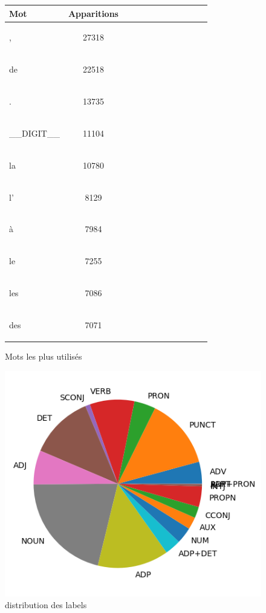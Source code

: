 \begin{figure}[H] \begin{minipage}{0.48\textwidth} \centering \begin{tabular}{|l || *{11 }{|c} |} \hline
Mot & Apparitions  \\ \hline
\begin{verb} , \end{verb} &27318\\ \hline
\begin{verb} de \end{verb} &22518\\ \hline
\begin{verb} . \end{verb} &13735\\ \hline
\begin{verb} __DIGIT__ \end{verb} &11104\\ \hline
\begin{verb} la \end{verb} &10780\\ \hline
\begin{verb} l' \end{verb} &8129\\ \hline
\begin{verb} à \end{verb} &7984\\ \hline
\begin{verb} le \end{verb} &7255\\ \hline
\begin{verb} les \end{verb} &7086\\ \hline
\begin{verb} des \end{verb} &7071\\ \hline

\end{tabular}
\caption{ Mots les plus utilisés } \label{Fig:muw}\end{minipage} 
\begin{minipage}{0.48\textwidth} \centering
\includegraphics[width=.7\linewidth]{ftbtrain_img.png}
\caption{distribution des labels}
\end{minipage}
\end{figure}


